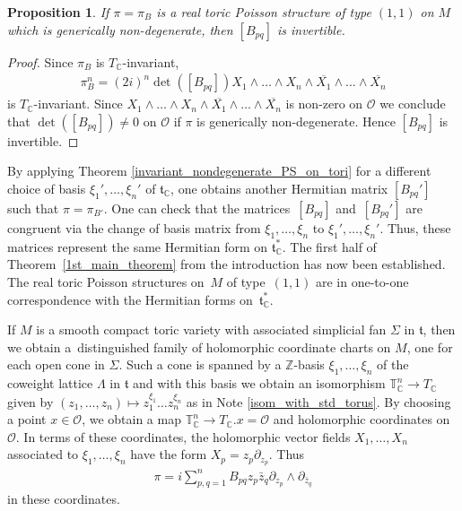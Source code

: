\documentclass[10pt,a4paper]{amsart}
\numberwithin{equation}{section}
\newtheorem{Proposition}[Theorem]{Proposition}
 { \theoremstyle{definition}
\newtheorem{Definition}[Theorem]{Definition}
\newtheorem{Note}[Theorem]{Note}
\newtheorem{Example}[Theorem]{Example}
\newtheorem{Remark}[Theorem]{Remark} }
\begin{document}
\begin{Proposition}\label{generically_nondeg_prop}
If $\pi=\pi_B$ is a real toric Poisson structure of type $(1,1)$ on $M$ which is generically non-degenerate, then $[B_{pq}]$ is invertible.
\end{Proposition}
\begin{proof}
Since $\pi_B$ is $T_{\mathbb C}$-invariant,
\begin{gather*}
\pi_B^n=(2i)^n\det([B_{pq}])X_1\wedge\dots \wedge X_n\wedge \overline{X_1}\wedge \dots \wedge \overline{X_n}
\end{gather*}
is $T_{\mathbb C}$-invariant. Since $X_1\wedge\dots \wedge X_n\wedge \overline{X_1}\wedge \dots \wedge \overline{X_n}$ is non-zero on $\mathcal O$ we conclude that $\det([B_{pq}])\not=0$ on $\mathcal O$ if $\pi$ is generically non-degenerate. Hence $[B_{pq}]$ is invertible.
\end{proof}

\begin{Remark}
By applying Theorem \ref{invariant_nondegenerate_PS_on_tori} for a dif\/ferent choice of basis $\xi_1',\dots,\xi_n'$ of ${\mathfrak t}_{\mathbb C}$, one obtains another Hermitian matrix $[B_{pq}']$ such that $\pi=\pi_{B'}$. One can check that the matri\-ces~$[B_{pq}]$ and~$[B_{pq}']$ are congruent via the change of basis matrix from $\xi_1,\dots,\xi_n$ to $\xi_1',\dots,\xi_n'$. Thus, these matrices represent the same Hermitian form on ${\mathfrak t}_{\mathbb C}^*$. The f\/irst half of Theorem~\ref{1st_main_theorem} from the introduction has now been established. The real toric Poisson structures on~$M$ of type~$(1,1)$ are in one-to-one correspondence with the Hermitian forms on~${\mathfrak t}_{\mathbb C}^*$.
\end{Remark}

If $M$ is a smooth compact toric variety with associated simplicial fan $\Sigma$ in ${\mathfrak t}$, then we obtain a~distinguished family of holomorphic coordinate charts on $M$, one for each open cone in $\Sigma$. Such a cone is spanned by a ${\mathbb Z}$-basis $\xi_1,\dots,\xi_n$ of the coweight lattice $\Lambda$ in ${\mathfrak t}$ and with this basis we obtain an isomorphism ${\mathbb T}_{\mathbb C}^n\to T_{\mathbb C}$ given by $(z_1,\dots,z_n)\mapsto z_1^{\xi_1}\dots z_n^{\xi_n}$ as in Note \ref{isom_with_std_torus}. By choosing a point $x\in\mathcal O$, we obtain a map ${\mathbb T}_{\mathbb C}^n\to T_{\mathbb C}.x=\mathcal O$ and holomorphic coordinates on $\mathcal O$. In terms of these coordinates, the holomorphic vector f\/ields $X_1,\dots,X_n$ associated to $\xi_1,\dots,\xi_n$ have the form $X_p=z_p\partial_{z_p}$. Thus
\begin{gather}\label{pi_B_in_coordinates}
\pi=i\sum_{p,q=1}^n B_{pq} z_p\bar{z}_q \partial_{z_p}\wedge\partial_{\bar{z}_q}
\end{gather}
in these coordinates.
\end{document}
